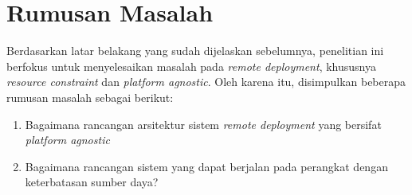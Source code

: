 \section{Rumusan Masalah}

Berdasarkan latar belakang yang sudah dijelaskan sebelumnya, penelitian ini berfokus untuk menyelesaikan masalah pada \textit{remote deployment}, khususnya \textit{resource constraint} dan \textit{platform agnostic}. Oleh karena itu, disimpulkan beberapa rumusan masalah sebagai berikut:

\begin{enumerate}
  \item Bagaimana rancangan arsitektur sistem \textit{remote deployment} yang bersifat \textit{platform agnostic}
  \item Bagaimana rancangan sistem yang dapat berjalan pada perangkat dengan keterbatasan sumber daya?
\end{enumerate}